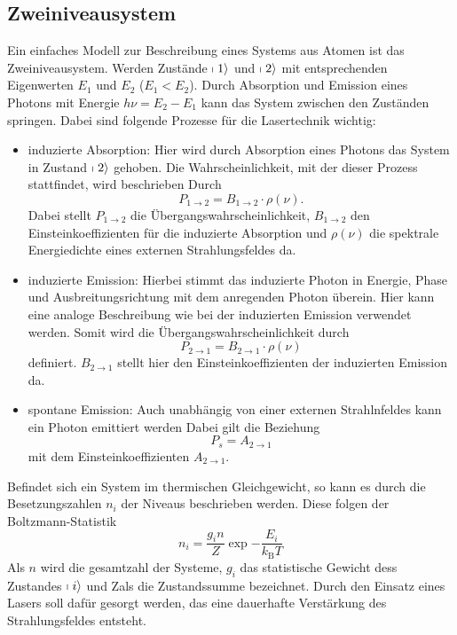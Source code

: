 \subsection{Zweiniveausystem}
Ein einfaches Modell zur Beschreibung eines Systems aus Atomen ist das Zweiniveausystem.
Werden Zustände $\shortmid 1 \rangle$ und $\shortmid 2 \rangle$ mit entsprechenden
Eigenwerten $E_1$ und $E_2$ ($E_1<E_2$). Durch Absorption und Emission eines Photons mit
Energie $h\nu=E_2-E_1$ kann das System zwischen den Zuständen springen. Dabei sind
folgende Prozesse für die Lasertechnik wichtig:
\begin{itemize}
  \item induzierte Absorption:
  Hier wird durch Absorption eines Photons das System in Zustand $\shortmid 2 \rangle$
  gehoben. Die Wahrscheinlichkeit, mit der dieser Prozess stattfindet, wird beschrieben
  Durch
  \begin{equation}
    P_{1\rightarrow 2} = B_{1\rightarrow 2}\cdot \rho(\nu).
  \end{equation}
  Dabei stellt $P_{1\rightarrow 2}$ die Übergangswahrscheinlichkeit, $B_{1\rightarrow 2}$ den
  Einsteinkoeffizienten für die induzierte Absorption und $\rho(\nu)$ die spektrale Energiedichte
  eines externen Strahlungsfeldes da.
  \item induzierte Emission:
  Hierbei stimmt das induzierte Photon in Energie, Phase und Ausbreitungsrichtung
  mit dem anregenden Photon überein. Hier kann eine analoge Beschreibung wie bei der
  induzierten Emission verwendet werden. Somit wird die Übergangswahrscheinlichkeit durch
  \begin{equation}
    P_{2\rightarrow 1} = B_{2\rightarrow 1}\cdot\rho(\nu)
  \end{equation}
  definiert. $B_{2\rightarrow 1}$ stellt hier den Einsteinkoeffizienten der induzierten
  Emission da.
  \item spontane Emission:
  Auch unabhängig von einer externen Strahlnfeldes kann ein Photon emittiert werden
  Dabei gilt die Beziehung
  \begin{equation}
    P_s = A_{2\rightarrow 1}
  \end{equation}
  mit dem Einsteinkoeffizienten $A_{2\rightarrow 1}$.
\end{itemize}

Befindet sich ein System im thermischen Gleichgewicht, so kann es durch die
Besetzungszahlen $n_i$ der Niveaus beschrieben werden. Diese folgen der Boltzmann-Statistik
\begin{equation}
    n_i = \frac{g_in}{Z}\exp{-\frac{E_i}{k_\text{B}T}}
\end{equation}
Als $n$ wird die gesamtzahl der Systeme, $g_i$ das statistische Gewicht dess Zustandes
$\shortmid i \rangle$ und Zals die Zustandssumme bezeichnet. Durch den Einsatz
eines Lasers soll dafür gesorgt werden, das eine dauerhafte Verstärkung des
Strahlungsfeldes entsteht.

